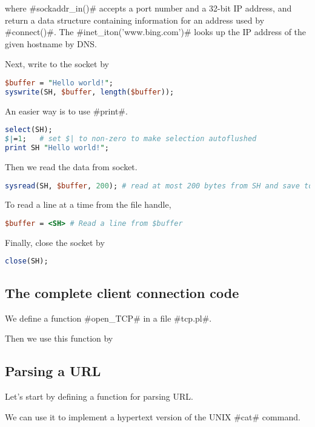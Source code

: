 \documentclass[a4paper]{article}
\begin{document}
where #sockaddr_in()# accepts a port number and a 32-bit IP address,
and return a data structure containing information for an address used by #connect()#.
The #inet_iton('www.bing.com')# looks up the IP address of the given hostname by DNS.

Next, write to the socket by
\begin{lstlisting}[language=Perl]
$buffer = "Hello world!";
syswrite(SH, $buffer, length($buffer));
\end{lstlisting}

An easier way is to use #print#.
\begin{lstlisting}[language=Perl]
select(SH);
$|=1;	# set $| to non-zero to make selection autoflushed
print SH "Hello world!";
\end{lstlisting}

Then we read the data from socket.
\begin{lstlisting}[language=Perl]
sysread(SH, $buffer, 200); # read at most 200 bytes from SH and save to $buffer
\end{lstlisting}

To read a line at a time from the file handle,
\begin{lstlisting}[language=Perl]
$buffer = <SH> # Read a line from $buffer
\end{lstlisting}

Finally, close the socket by
\begin{lstlisting}[language=Perl]
close(SH);
\end{lstlisting}

\subsection{The complete client connection code}

We define a function #open_TCP# in a file #tcp.pl#.


Then we use this function by


\subsection{Parsing a URL}

Let's start by defining a function for parsing URL.


We can use it to implement a hypertext version of the UNIX #cat# command.

\end{document}
